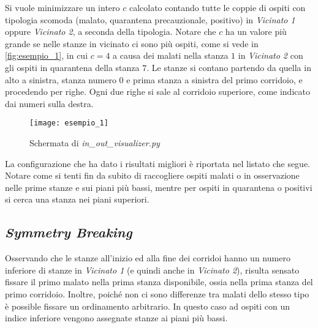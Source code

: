 \noindent
Si vuole minimizzare un intero $c$ calcolato contando tutte le coppie di ospiti con tipologia scomoda (malato, quarantena precauzionale, positivo) in \emph{Vicinato 1} oppure \emph{Vicinato 2}, a seconda della tipologia.
Notare che $c$ ha un valore più grande se nelle stanze in vicinato ci sono più ospiti, come si vede in \autoref{fig:esempio_1}, in cui $c=4$ a causa dei malati nella stanza $1$ in \emph{Vicinato 2} con gli ospiti in quarantena della stanza $7$.
Le stanze si contano partendo da quella in alto a sinistra, stanza numero 0 e prima stanza a sinistra del primo corridoio, e procedendo per righe.
Ogni due righe si sale al corridoio superiore, come indicato dai numeri sulla destra.

\begin{figure}[ht]
  \centering
  \texttt{[image: esempio\_1]}
  \caption{Schermata di \emph{in\_out\_visualizer.py}}
  \label{fig:esempio_1}
\end{figure}

\noindent
La configurazione che ha dato i risultati migliori è riportata nel listato che segue.
Notare come si tenti fin da subito di raccogliere ospiti malati o in osservazione nelle prime stanze e sui piani più bassi, mentre per ospiti in quarantena o positivi si cerca una stanza nei piani superiori.


\subsection{\emph{Symmetry Breaking}}
Osservando che le stanze all'inizio ed alla fine dei corridoi hanno un numero inferiore di stanze in \emph{Vicinato 1} (e quindi anche in \emph{Vicinato 2}), risulta sensato fissare il primo malato nella prima stanza disponibile, ossia nella prima stanza del primo corridoio.
Inoltre, poiché non ci sono differenze tra malati dello stesso tipo è possible fissare un ordinamento arbitrario.
In questo caso ad ospiti con un indice inferiore vengono assegnate stanze ai piani più bassi.

